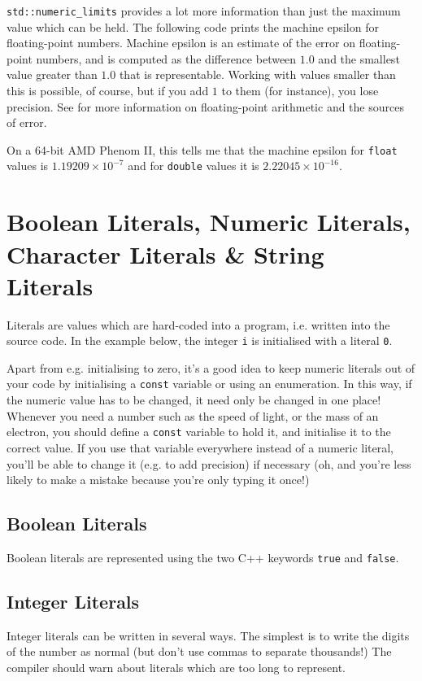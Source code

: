 \documentclass[a4paper]{scrartcl}
\begin{document}


\texttt{std::numeric\_limits} provides a lot more information than just the maximum value which can be held. The following code prints the machine epsilon for floating-point numbers. Machine epsilon is an estimate of the error on floating-point numbers, and is computed as the difference between $1.0$ and the smallest value greater than $1.0$ that is representable. Working with values smaller than this is possible, of course, but if you add $1$ to them (for instance), you lose precision. See \cite{Goldberg1991} for more information on floating-point arithmetic and the sources of error.



On a 64-bit AMD Phenom II, this tells me that the machine epsilon for \texttt{float} values is $1.19209\times 10^{-7}$ and for \texttt{double} values it is $2.22045\times 10^{-16}$.

\section{Boolean Literals, Numeric Literals, Character Literals \& String Literals}
Literals are values which are hard-coded into a program, i.e. written into the source code. In the example below, the integer \texttt{i} is initialised with a literal \texttt{0}.



Apart from e.g. initialising to zero, it's a good idea to keep numeric literals out of your code by initialising a \texttt{const} variable or using an enumeration. In this way, if the numeric value has to be changed, it need only be changed in one place! Whenever you need a number such as the speed of light, or the mass of an electron, you should define a \texttt{const} variable to hold it, and initialise it to the correct value. If you use that variable everywhere instead of a numeric literal, you'll be able to change it (e.g. to add precision) if necessary (oh, and you're less likely to make a mistake because you're only typing it once!)

\subsection{Boolean Literals}
Boolean literals are represented using the two C++ keywords \texttt{true} and \texttt{false}.

\subsection{Integer Literals}
Integer literals can be written in several ways. The simplest is to write the digits of the number as normal (but don't use commas to separate thousands!) The compiler should warn about literals which are too long to represent.
\end{document}

